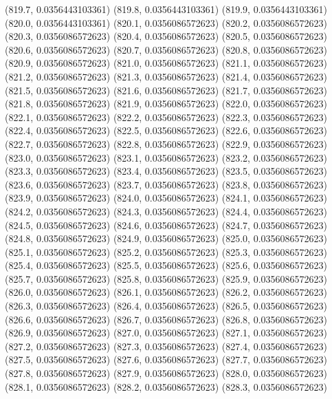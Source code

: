 {					(819.7, 0.0356443103361)
					(819.8, 0.0356443103361)
					(819.9, 0.0356443103361)
					(820.0, 0.0356443103361)
					(820.1, 0.0356086572623)
					(820.2, 0.0356086572623)
					(820.3, 0.0356086572623)
					(820.4, 0.0356086572623)
					(820.5, 0.0356086572623)
					(820.6, 0.0356086572623)
					(820.7, 0.0356086572623)
					(820.8, 0.0356086572623)
					(820.9, 0.0356086572623)
					(821.0, 0.0356086572623)
					(821.1, 0.0356086572623)
					(821.2, 0.0356086572623)
					(821.3, 0.0356086572623)
					(821.4, 0.0356086572623)
					(821.5, 0.0356086572623)
					(821.6, 0.0356086572623)
					(821.7, 0.0356086572623)
					(821.8, 0.0356086572623)
					(821.9, 0.0356086572623)
					(822.0, 0.0356086572623)
					(822.1, 0.0356086572623)
					(822.2, 0.0356086572623)
					(822.3, 0.0356086572623)
					(822.4, 0.0356086572623)
					(822.5, 0.0356086572623)
					(822.6, 0.0356086572623)
					(822.7, 0.0356086572623)
					(822.8, 0.0356086572623)
					(822.9, 0.0356086572623)
					(823.0, 0.0356086572623)
					(823.1, 0.0356086572623)
					(823.2, 0.0356086572623)
					(823.3, 0.0356086572623)
					(823.4, 0.0356086572623)
					(823.5, 0.0356086572623)
					(823.6, 0.0356086572623)
					(823.7, 0.0356086572623)
					(823.8, 0.0356086572623)
					(823.9, 0.0356086572623)
					(824.0, 0.0356086572623)
					(824.1, 0.0356086572623)
					(824.2, 0.0356086572623)
					(824.3, 0.0356086572623)
					(824.4, 0.0356086572623)
					(824.5, 0.0356086572623)
					(824.6, 0.0356086572623)
					(824.7, 0.0356086572623)
					(824.8, 0.0356086572623)
					(824.9, 0.0356086572623)
					(825.0, 0.0356086572623)
					(825.1, 0.0356086572623)
					(825.2, 0.0356086572623)
					(825.3, 0.0356086572623)
					(825.4, 0.0356086572623)
					(825.5, 0.0356086572623)
					(825.6, 0.0356086572623)
					(825.7, 0.0356086572623)
					(825.8, 0.0356086572623)
					(825.9, 0.0356086572623)
					(826.0, 0.0356086572623)
					(826.1, 0.0356086572623)
					(826.2, 0.0356086572623)
					(826.3, 0.0356086572623)
					(826.4, 0.0356086572623)
					(826.5, 0.0356086572623)
					(826.6, 0.0356086572623)
					(826.7, 0.0356086572623)
					(826.8, 0.0356086572623)
					(826.9, 0.0356086572623)
					(827.0, 0.0356086572623)
					(827.1, 0.0356086572623)
					(827.2, 0.0356086572623)
					(827.3, 0.0356086572623)
					(827.4, 0.0356086572623)
					(827.5, 0.0356086572623)
					(827.6, 0.0356086572623)
					(827.7, 0.0356086572623)
					(827.8, 0.0356086572623)
					(827.9, 0.0356086572623)
					(828.0, 0.0356086572623)
					(828.1, 0.0356086572623)
					(828.2, 0.0356086572623)
					(828.3, 0.0356086572623)
}
